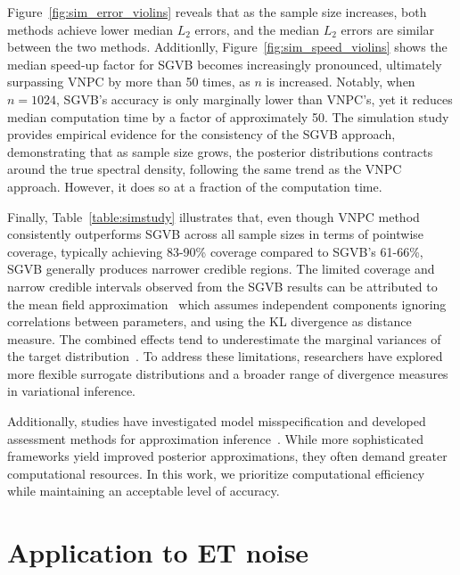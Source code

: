 \documentclass[%
 reprint,
 amsmath,amssymb,
 aps,
 nofootinbib,
]{revtex4-2}
\begin{document}



Figure~\ref{fig:sim_error_violins} reveals that as the sample size increases, both methods achieve lower median $L_2$ errors, and the median $L_2$ errors are similar between the two methods. 
Additionlly, Figure~\ref{fig:sim_speed_violins} shows the median speed-up factor for SGVB becomes increasingly pronounced, ultimately surpassing VNPC by more than 50 times, as $n$ is increased. 
Notably, when $n=1024$, SGVB's accuracy is only marginally lower than VNPC's, yet it reduces median computation time by a factor of approximately 50. 
The simulation study provides empirical evidence for the consistency of the SGVB approach, demonstrating that as sample size grows, the posterior distributions contracts around the true spectral density, following the same trend as the VNPC approach. However, it does so at a fraction of the computation time.

Finally, Table~\ref{table:simstudy} illustrates that, even though VNPC method consistently outperforms SGVB across all sample sizes in terms of pointwise coverage, typically achieving 83-90\% coverage compared to SGVB's 61-66\%, SGVB generally produces narrower credible regions.
%
The limited coverage and narrow credible intervals observed from the SGVB results can be attributed to the mean field approximation~\cite{Blei2017} which assumes independent components ignoring correlations between parameters, and using the KL divergence as distance measure. 
The combined effects tend to underestimate the marginal variances of the target distribution~\cite{Blei2006,Wang2005}. 
To address these limitations, researchers have explored more flexible surrogate distributions and a broader range of divergence measures in variational inference\cite{Kingma2013, Blei2017, Rezende2015,Yang2020,Higgins2017}. 

Additionally, studies have investigated model misspecification and developed assessment methods for approximation inference~\cite{Wang2019, yao2018, lee2019, yu2021}.
While more sophisticated frameworks yield improved posterior approximations, they often demand greater computational resources. 
In this work, we prioritize computational efficiency while maintaining an acceptable level of accuracy.



\section{Application to ET noise}
\label{sec:application}
\end{document}
